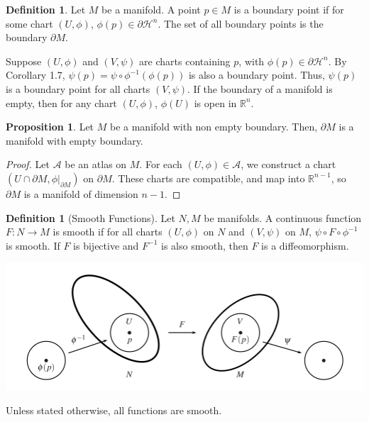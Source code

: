 \documentclass[]{article}
\theoremstyle{definition}
\theoremstyle{definition}
\newtheorem{definition}[theorem]{Definition} %
\newtheorem{proposition}[theorem]{Proposition}
\begin{document}
\begin{definition}
    Let $M$ be a manifold. A point $p\in M$ is a boundary point if for some chart $(U, \phi)$, $\phi(p)\in \partial \mathcal{H}^n$. The set of all boundary points is the boundary $\partial M$.
\end{definition}

Suppose $(U,\phi)$ and $(V,\psi)$ are charts containing $p$, with $\phi(p)\in\partial \mathcal{H}^n $. By Corollary 1.7, $\psi(p)=\psi\circ\phi^{-1}(\phi(p))$ is also a boundary point. Thus, $\psi(p)$ is a boundary point for all charts $(V, \psi)$. If the boundary of a manifold is empty, then for any chart $(U, \phi)$, $\phi(U)$ is open in $\mathbb{R}^n$.

\begin{proposition}
    Let $M$ be a manifold with non empty boundary. Then, $\partial M$ is a manifold with empty boundary.
\end{proposition}
\begin{proof}
    Let $\mathcal{A}$ be an atlas on $M$. For each $(U, \phi)\in \mathcal{A}$, we construct a chart $(U\cap \partial M , \phi|_{\partial M})$ on $\partial M$. These charts are compatible, and map into $\mathbb{R}^{n-1}$, so $\partial M$ is a manifold of dimension $n-1$.
\end{proof}

\begin{definition}[Smooth Functions]
    Let $N,M$ be manifolds. A continuous function $F:N\rightarrow M$ is smooth if for all charts $(U, \phi)$ on $N$ and $(V, \psi)$ on $M$, $\psi\circ F\circ \phi^{-1}$ is smooth. If $F$ is bijective and $F^{-1}$ is also smooth, then $F$ is a diffeomorphism.
\end{definition}

\begin{center}
    \includegraphics[scale=0.5]{smooth_function.PNG}
\end{center}

Unless stated otherwise, all functions are smooth.
\end{document}
